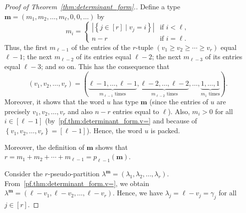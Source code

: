 \documentclass[reqno]{amsart}
\newcommand{\0}{\phantom{c}}
\newcommand{\mm}{\mathbf{m}}
\newcommand{\NN}{\mathbb{N}}
\newcommand{\set}[1]{\left\{ #1 \right\}}
\newcommand{\abs}[1]{\left| #1 \right|}
\newcommand{\tup}[1]{\left( #1 \right)}
\newcommand{\ive}[1]{\left[ #1 \right]}
\theoremstyle{plain}
\theoremstyle{definition}
\numberwithin{equation}{section}
\begin{document}
\begin{proof}[Proof of Theorem~\ref{thm:determinant_form}.]
Define a type $\mm = \tup{m_1, m_2, \dotsc, m_{\ell}, 0, 0, \ldots}$ by
\[
m_i =
  \begin{cases}
  \abs{ \set{ j \in \ive{r} \mid v_j = i}} & \text{if } i < \ell,\\
  n - r & \text{if } i = \ell.
  \end{cases}
\]
Thus, the first $m_{\ell-1}$ of the entries of the $r$-tuple $\tup{v_1 \geq v_2 \geq \cdots \geq v_r}$ equal $\ell-1$; the next $m_{\ell-2}$ of its entries equal $\ell-2$; the next $m_{\ell-3}$ of its entries equal $\ell-3$; and so on.
This has the consequence that
\begin{equation}
\label{pf.thm:determinant_form.v=}
\tup{v_1, v_2, \dotsc, v_r} = (
  \underbrace{\ell-1,\ldots,\ell-1}_{m_{\ell-1}\text{ times}},
  \underbrace{\ell-2,\ldots,\ell-2}_{m_{\ell-2}\text{ times}},
  \dotsc,
  \underbrace{1,\ldots,1}_{m_1\text{ times}}
).
\end{equation}
Moreover, it shows that the word $u$ has type $\mm$ (since the entries of $u$ are precisely $v_1, v_2, \dotsc, v_r$ and also $n-r$ entries equal to $\ell$).
Also, $m_i > 0$ for all $i \in \ive{\ell-1}$ (by~\eqref{pf.thm:determinant_form.v=} and because of $\set{v_1, v_2, \dotsc, v_r} = \ive{\ell-1}$).
Hence, the word $u$ is packed.

Moreover, the definition of $\mm$ shows that $r = m_1 + m_2 + \cdots + m_{\ell-1} = p_{\ell-1}(\mm)$.


Consider the $r$-pseudo-partition $\lambda^{\mm} = \tup{\lambda_1,\lambda_2, \dotsc, \lambda_r}$.
From~\eqref{pf.thm:determinant_form.v=}, we obtain $\lambda^{\mm} = \tup{\ell-v_1, \ell-v_2, \dotsc, \ell-v_r}$.
Hence, we have $\lambda_j = \ell - v_j = \gamma_j$ for all $j \in \ive{r}$.


\end{proof}
\end{document}
